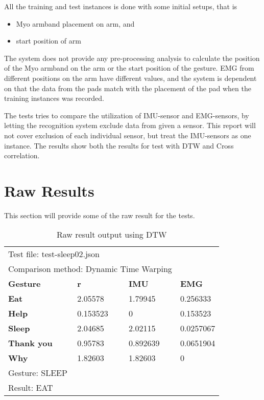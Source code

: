 All the training and test instances is done with some initial setups, that is
\begin{itemize}
    \item Myo armband placement on arm, and
    \item start position of arm
\end{itemize}
The system does not provide any pre-processing analysis to calculate the position of the Myo armband on the arm or the start position of the gesture. EMG from different positions on the arm have different values, and the system is dependent on that the data from the pads match with the placement of the pad when the training instances was recorded.

The tests tries to compare the utilization of IMU-sensor and EMG-sensors, by letting the recognition system exclude data from given a sensor. This report will not cover exclusion of each individual sensor, but treat the IMU-sensors as one instance. The results show both the results for test with DTW and Cross correlation.  

\section{Raw Results}
This section will provide some of the raw result for the tests. 

\begin{table}[H]
\centering
    \begin{tabular}{  l  p{3cm}  p{3cm} p{3cm}}
        \multicolumn{3}{l}{Test file: test-sleep02.json} \\
        \multicolumn{3}{l}{Comparison method: Dynamic Time Warping} \\[0.3cm]
        \hline
        \textbf{Gesture} & \textbf{r} & \textbf{IMU} & \textbf{EMG} \\ \Xhline{4\arrayrulewidth}
        
        \textbf{Eat} & 2.05578 &  1.79945 & 0.256333 \\ 
        
        \textbf{Help}  & 0.153523 &  0 & 0.153523 \\ 
        
        \textbf{Sleep}  & 2.04685 &  2.02115 & 0.0257067 \\ 
        
        \textbf{Thank you} & 0.95783 &  0.892639 & 0.0651904 \\ 
        
        \textbf{Why} & 1.82603 &  1.82603 & 0 \\ 
        \hline
        
        \multicolumn{3}{l}{Gesture: SLEEP} \\
        \multicolumn{3}{l}{Result: EAT}\\
    \end{tabular}
    \caption[Raw Result of DTW]{Raw result output using DTW}
    \label{table:raw_result_test-sleep02_DTW}
\end{table}

